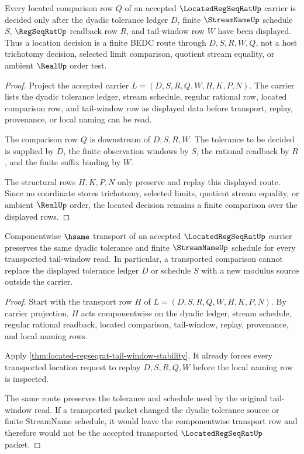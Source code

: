 \begin{theorem}
\label{thm:located-regseqrat-finite-location-decision}
Every located comparison row $Q$ of an accepted $\LocatedRegSeqRatUp$ carrier is decided only after the dyadic tolerance ledger $D$, finite $\StreamNameUp$ schedule $S$, $\RegSeqRatUp$ readback row $R$, and tail-window row $W$ have been displayed. Thus a location decision is a finite BEDC route through $D,S,R,W,Q$, not a host trichotomy decision, selected limit comparison, quotient stream equality, or ambient $\RealUp$ order test.
\end{theorem}
\begin{proof}
Project the accepted carrier $L=(D,S,R,Q,W,H,K,P,N)$. The carrier lists the dyadic tolerance ledger, stream schedule, regular rational row, located comparison row, and tail-window row as displayed data before transport, replay, provenance, or local naming can be read.

The comparison row $Q$ is downstream of $D,S,R,W$. The tolerance to be decided is supplied by $D$, the finite observation windows by $S$, the rational readback by $R$, and the finite suffix binding by $W$.

The structural rows $H,K,P,N$ only preserve and replay this displayed route. Since no coordinate stores trichotomy, selected limits, quotient stream equality, or ambient $\RealUp$ order, the located decision remains a finite comparison over the displayed rows.
\end{proof}

\begin{theorem}
\label{thm:located-regseqrat-tail-modulus-transport}
Componentwise $\hsame$ transport of an accepted $\LocatedRegSeqRatUp$ carrier preserves the same dyadic tolerance and finite $\StreamNameUp$ schedule for every transported tail-window read. In particular, a transported comparison cannot replace the displayed tolerance ledger $D$ or schedule $S$ with a new modulus source outside the carrier.
\end{theorem}
\begin{proof}
Start with the transport row $H$ of $L=(D,S,R,Q,W,H,K,P,N)$. By carrier projection, $H$ acts componentwise on the dyadic ledger, stream schedule, regular rational readback, located comparison, tail-window, replay, provenance, and local naming rows.

Apply \autoref{thm:located-regseqrat-tail-window-stability}. It already forces every transported location request to replay $D,S,R,Q,W$ before the local naming row is inspected.

The same route preserves the tolerance and schedule used by the original tail-window read. If a transported packet changed the dyadic tolerance source or finite StreamName schedule, it would leave the componentwise transport row and therefore would not be the accepted transported $\LocatedRegSeqRatUp$ packet.
\end{proof}


